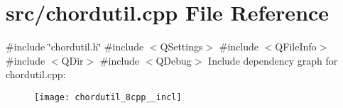 \section{src/chordutil.cpp File Reference}
\label{chordutil_8cpp}
{\ttfamily \#include \char`\"{}chordutil.\+h\char`\"{}}\newline
{\ttfamily \#include $<$Q\+Settings$>$}\newline
{\ttfamily \#include $<$Q\+File\+Info$>$}\newline
{\ttfamily \#include $<$Q\+Dir$>$}\newline
{\ttfamily \#include $<$Q\+Debug$>$}\newline
Include dependency graph for chordutil.\+cpp\+:\nopagebreak
\begin{figure}[H]
\begin{center}
\leavevmode
\texttt{[image: chordutil\_8cpp\_\_incl]}
\end{center}
\end{figure}
